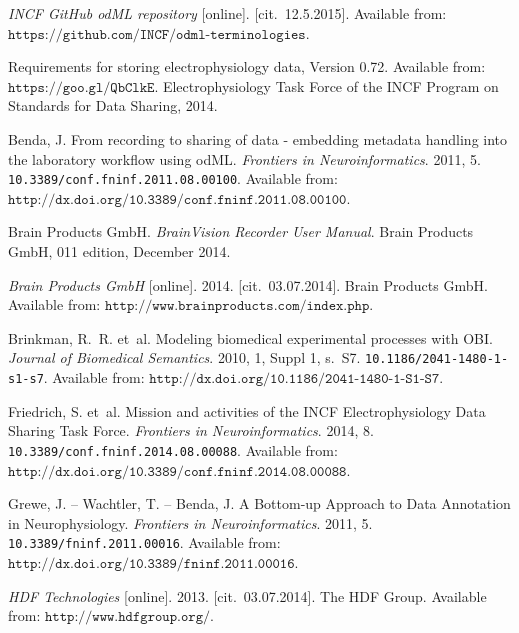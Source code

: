 \documentclass[conference]{IEEEtran}
\begin{document}
\begin{thebibliography}{1}
\emph{INCF GitHub odML repository} [online]. [cit.~12.5.2015].
\newblock Available from:
$\texttt{{https://github.com/INCF/odml-terminologies}}$.


Requirements for storing electrophysiology data, Version 0.72.
\newblock Available from: $\texttt{{https://goo.gl/QbClkE}}$.
\newblock Electrophysiology Task Force of the INCF Program on Standards for
Data Sharing, 2014.

{\sc Benda}, J.
\newblock From recording to sharing of data - embedding metadata handling into
the laboratory workflow using {odML}.
\newblock \emph{Frontiers in Neuroinformatics}. 2011, 5.
\newblock \texttt{10.3389/conf.fninf.2011.08.00100}.
\newblock Available from:
$\texttt{{http://dx.doi.org/10.3389/conf.fninf.2011.08.00100}}$.

Brain Products GmbH.
\newblock \emph{BrainVision Recorder User Manual}.
\newblock Brain Products GmbH, 011 edition, December 2014.

\emph{Brain Products GmbH} [online]. 2014. [cit.~03.07.2014].
Brain Products GmbH.
\newblock Available from: $\texttt{{http://www.brainproducts.com/index.php}}$.



{\sc Brinkman}, R.~R. et~al.
\newblock Modeling biomedical experimental processes with {OBI}.
\newblock \emph{Journal of Biomedical Semantics}. 2010, 1, Suppl 1, s.~S7.
\newblock \texttt{10.1186/2041-1480-1-s1-s7}.
\newblock Available from:
$\texttt{{http://dx.doi.org/10.1186/2041-1480-1-S1-S7}}$.



{\sc Friedrich}, S. et~al.
\newblock Mission and activities of the {INCF} Electrophysiology Data Sharing
Task Force.
\newblock \emph{Frontiers in Neuroinformatics}. 2014, 8.
\newblock \texttt{10.3389/conf.fninf.2014.08.00088}.
\newblock Available from:
$\texttt{{http://dx.doi.org/10.3389/conf.fninf.2014.08.00088}}$.



{\sc Grewe}, J. -- {\sc Wachtler}, T. -- {\sc Benda}, J.
\newblock A Bottom-up Approach to Data Annotation in Neurophysiology.
\newblock \emph{Frontiers in Neuroinformatics}. 2011, 5.
\newblock \texttt{10.3389/fninf.2011.00016}.
\newblock Available from:
$\texttt{{http://dx.doi.org/10.3389/fninf.2011.00016}}$.

\emph{HDF Technologies} [online]. 2013. [cit.~03.07.2014]. The HDF Group.
\newblock Available from: $\texttt{{http://www.hdfgroup.org/}}$.


\end{thebibliography}
\end{document}
